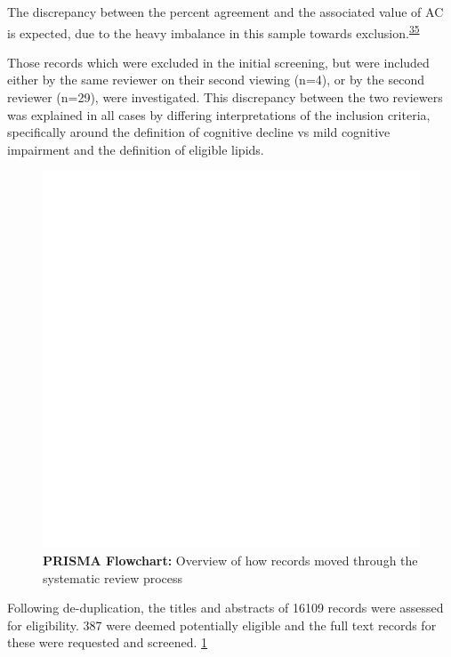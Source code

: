 \documentclass[a4paper, twoside]{templates/ociamthesis}
\begin{document}
The discrepancy between the percent agreement and the associated value of AC is expected, due to the heavy imbalance in this sample towards exclusion.\textsuperscript{\protect\hyperlink{ref-feinstein1990}{35}}

Those records which were excluded in the initial screening, but were included either by the same reviewer on their second viewing (n=4), or by the second reviewer (n=29), were investigated. This discrepancy between the two reviewers was explained in all cases by differing interpretations of the inclusion criteria, specifically around the definition of cognitive decline vs mild cognitive impairment and the definition of eligible lipids.





\begin{figure}
\includegraphics[width=1\linewidth]{figures/sys-rev/prismaflow} \caption[PRISMA Flowchart]{\textbf{PRISMA Flowchart:} Overview of how records moved through the systematic review process}\label{fig:prisma-flow-fig}
\end{figure}

Following de-duplication, the titles and abstracts of 16109 records were assessed for eligibility. 387 were deemed potentially eligible and the full text records for these were requested and screened. \ref{fig:prisma-flow-fig}
\end{document}
